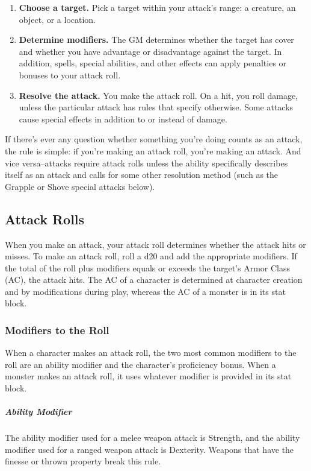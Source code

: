 \begin{enumerate}
\item \textbf{Choose a target.} Pick a target within your attack's range: a creature, an object, or a location.
\item \textbf{Determine modifiers.} The GM determines whether the target has cover and whether you have advantage or disadvantage against the target. In addition, spells, special abilities, and other effects can apply penalties or bonuses to your attack roll.
\item \textbf{Resolve the attack.} You make the attack roll. On a hit, you roll damage, unless the particular attack has rules that specify otherwise. Some attacks cause special effects in addition to or instead of damage.
\end{enumerate}

If there's ever any question whether something you're doing counts as an attack, the rule is simple: if you're making an attack roll, you're making an attack. And vice versa--attacks require attack rolls unless the ability specifically describes itself as an attack and calls for some other resolution method (such as the Grapple or Shove special attacks below).

\subsection{Attack Rolls}

When you make an attack, your attack roll determines whether the attack hits or misses. To make an attack roll, roll a d20 and add the appropriate modifiers. If the total of the roll plus modifiers equals or exceeds the target's Armor Class (AC), the attack hits. The AC of a character is determined at character creation and by modifications during play, whereas the AC of a monster is in its stat block.

\subsubsection{Modifiers to the Roll}

When a character makes an attack roll, the two most common modifiers to the roll are an ability modifier and the character's proficiency bonus. When a monster makes an attack roll, it uses whatever modifier is provided in its stat block.

\subparagraph*{Ability Modifier} The ability modifier used for a melee weapon attack is Strength, and the ability modifier used for a ranged weapon attack is Dexterity. Weapons that have the finesse or thrown property break this rule.

